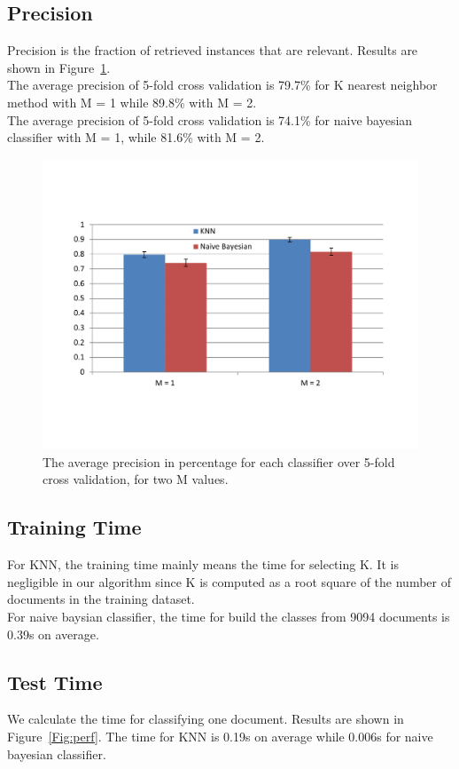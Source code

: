 \documentclass{article}
\begin{document}
\subsection{Precision}
Precision is the fraction of retrieved instances that are relevant. Results are shown in Figure~\ref{Fig:prec}.\\
The average precision of 5-fold cross validation is 79.7\% for K nearest neighbor method with M = 1 while 89.8\% with M = 2.\\
The average precision of 5-fold cross validation is 74.1\% for naive bayesian classifier with M = 1, while 81.6\% with M = 2. 
\begin{figure}
\includegraphics[width=1.0\textwidth]{Precision}
\caption{The average precision in percentage for each classifier over 5-fold cross validation, for two M values. }
\label{Fig:prec}
\end{figure}

\subsection{Training Time}
For KNN, the training time mainly means the time for selecting K. It is negligible in our algorithm since K is computed as a root square of the number of documents in the training dataset.\\
For naive baysian classifier, the time for build the classes from 9094 documents is 0.39s on average.
\subsection{Test Time}
We calculate the time for classifying one document. Results are shown in Figure~\ref{Fig:perf}. The time for KNN is 0.19s on average while 0.006s for naive bayesian classifier.
\end{document}
